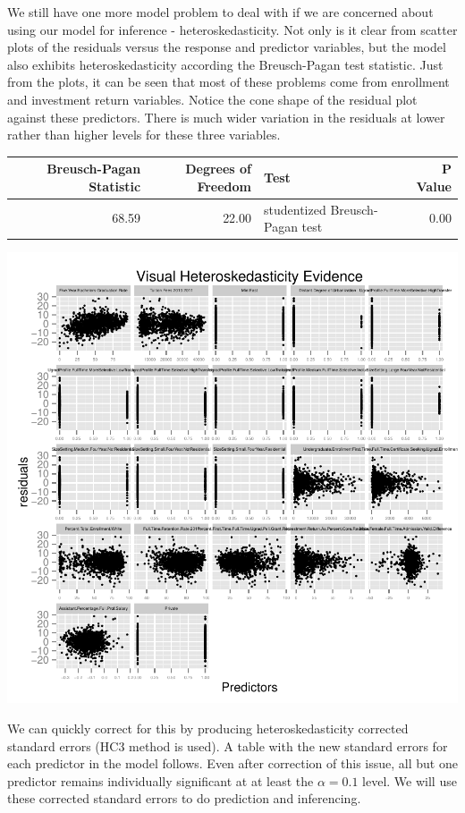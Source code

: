 \documentclass{article}
\begin{document}
We still have one more model problem to deal with if we are concerned about using our model for inference - heteroskedasticity. Not only is it clear from scatter plots of the residuals versus the response and predictor variables, but the model also exhibits heteroskedasticity according the Breusch-Pagan test statistic. Just from the plots, it can be seen that most of these problems come from enrollment and investment return variables. Notice the cone shape of the residual plot against these predictors. There is much wider variation in the residuals at lower rather than higher levels for these three variables.

\begin{table}[ht]
\centering
\begin{tabular}{rrrlr}
  \hline
 & Breusch-Pagan Statistic & Degrees of Freedom & Test & P Value \\ 
  \hline
 & 68.59 & 22.00 & studentized Breusch-Pagan test & 0.00 \\ 
   \hline
\end{tabular}
\end{table}\includegraphics{Fig-bptest}

\FloatBarrier

We can quickly correct for this by producing heteroskedasticity corrected standard errors (HC3 method is used). A table with the new standard errors for each predictor in the model follows. Even after correction of this issue, all but one predictor remains individually significant at at least the $\alpha = 0.1$ level. We will use these corrected standard errors to do prediction and inferencing.
\end{document}
